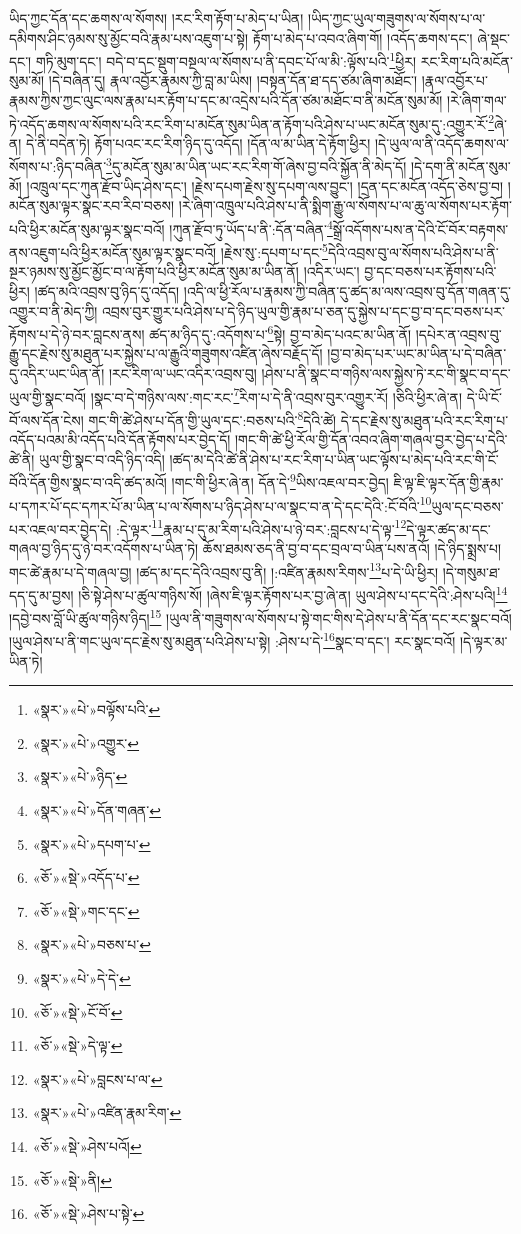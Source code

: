 ཡིད་ཀྱང་དོན་དང་ཆགས་ལ་སོགས། །རང་རིག་རྟོག་པ་མེད་པ་ཡིན། །ཡིད་ཀྱང་ཡུལ་གཟུགས་ལ་སོགས་པ་ལ་དམིགས་ཤིང་ཉམས་སུ་མྱོང་བའི་རྣམ་པས་འཇུག་པ་སྟེ། རྟོག་པ་མེད་པ་འབའ་ཞིག་གོ། །འདོད་ཆགས་དང་། ཞེ་སྡང་དང་། གཏི་མུག་དང་། བདེ་བ་དང་སྡུག་བསྔལ་ལ་སོགས་པ་ནི་དབང་པོ་ལ་མི་:ལྟོས་པའི་\footnote{«སྣར་»«པེ་»བལྟོས་པའི་}ཕྱིར། རང་རིག་པའི་མངོན་སུམ་མོ། །དེ་བཞིན་དུ། རྣལ་འབྱོར་རྣམས་ཀྱི་བླ་མ་ཡིས། །བསྟན་དོན་ཐ་དད་ཙམ་ཞིག་མཐོང་། །རྣལ་འབྱོར་པ་རྣམས་ཀྱིས་ཀྱང་ལུང་ལས་རྣམ་པར་རྟོག་པ་དང་མ་འདྲེས་པའི་དོན་ཙམ་མཐོང་བ་ནི་མངོན་སུམ་མོ། །རེ་ཞིག་གལ་ཏེ་འདོད་ཆགས་ལ་སོགས་པའི་རང་རིག་པ་མངོན་སུམ་ཡིན་ན་རྟོག་པའི་ཤེས་པ་ཡང་མངོན་སུམ་དུ་:འགྱུར་རོ་\footnote{«སྣར་»«པེ་»འགྱུར་}ཞེ་ན། དེ་ནི་བདེན་ཏེ། རྟོག་པའང་རང་རིག་ཉིད་དུ་འདོད། །དོན་ལ་མ་ཡིན་དེ་རྟོག་ཕྱིར། །དེ་ཡུལ་ལ་ནི་འདོད་ཆགས་ལ་སོགས་པ་:ཉིད་བཞིན་\footnote{«སྣར་»«པེ་»ཉིད་}དུ་མངོན་སུམ་མ་ཡིན་ཡང་རང་རིག་གོ་ཞེས་བྱ་བའི་སྐྱོན་ནི་མེད་དོ། །དེ་དག་ནི་མངོན་སུམ་མོ། །འཁྲུལ་དང་ཀུན་རྫོབ་ཡིད་ཤེས་དང་། །རྗེས་དཔག་རྗེས་སུ་དཔག་ལས་བྱུང་། །དྲན་དང་མངོན་འདོད་ཅེས་བྱ་བ། །མངོན་སུམ་ལྟར་སྣང་རབ་རིབ་བཅས། །རེ་ཞིག་འཁྲུལ་པའི་ཤེས་པ་ནི་སྨིག་རྒྱུ་ལ་སོགས་པ་ལ་ཆུ་ལ་སོགས་པར་རྟོག་པའི་ཕྱིར་མངོན་སུམ་ལྟར་སྣང་བའོ། །ཀུན་རྫོབ་ཏུ་ཡོད་པ་ནི་:དོན་བཞིན་\footnote{«སྣར་»«པེ་»དོན་གཞན་}སྒྲོ་འདོགས་པས་ན་དེའི་ངོ་བོར་བརྟགས་ནས་འཇུག་པའི་ཕྱིར་མངོན་སུམ་ལྟར་སྣང་བའོ། །རྗེས་སུ་:དཔག་པ་དང་\footnote{«སྣར་»«པེ་»དཔག་པ་}དེའི་འབྲས་བུ་ལ་སོགས་པའི་ཤེས་པ་ནི་སྔར་ཉམས་སུ་མྱོང་མྱོང་བ་ལ་རྟོག་པའི་ཕྱིར་མངོན་སུམ་མ་ཡིན་ནོ། །འདིར་ཡང་། བྱ་དང་བཅས་པར་རྟོགས་པའི་ཕྱིར། །ཚད་མའི་འབྲས་བུ་ཉིད་དུ་འདོད། །འདི་ལ་ཕྱི་རོལ་པ་རྣམས་ཀྱི་བཞིན་དུ་ཚད་མ་ལས་འབྲས་བུ་དོན་གཞན་དུ་འགྱུར་བ་ནི་མེད་ཀྱི། འབྲས་བུར་གྱུར་པའི་ཤེས་པ་དེ་ཉིད་ཡུལ་གྱི་རྣམ་པ་ཅན་དུ་སྐྱེས་པ་དང་བྱ་བ་དང་བཅས་པར་རྟོགས་པ་དེ་ཉེ་བར་བླངས་ནས། ཚད་མ་ཉིད་དུ་:འདོགས་པ་\footnote{«ཅོ་»«སྡེ་»འདོད་པ་}སྟེ། བྱ་བ་མེད་པའང་མ་ཡིན་ནོ། །དཔེར་ན་འབྲས་བུ་རྒྱུ་དང་རྗེས་སུ་མཐུན་པར་སྐྱེས་པ་ལ་རྒྱུའི་གཟུགས་འཛིན་ཞེས་བརྗོད་དོ། །བྱ་བ་མེད་པར་ཡང་མ་ཡིན་པ་དེ་བཞིན་དུ་འདིར་ཡང་ཡིན་ནོ། །རང་རིག་ལ་ཡང་འདིར་འབྲས་བུ། །ཤེས་པ་ནི་སྣང་བ་གཉིས་ལས་སྐྱེས་ཏེ་རང་གི་སྣང་བ་དང་ཡུལ་གྱི་སྣང་བའོ། །སྣང་བ་དེ་གཉིས་ལས་:གང་རང་\footnote{«ཅོ་»«སྡེ་»གང་དང་}རིག་པ་དེ་ནི་འབྲས་བུར་འགྱུར་རོ། །ཅིའི་ཕྱིར་ཞེ་ན། དེ་ཡི་ངོ་བོ་ལས་དོན་ངེས། གང་གི་ཚེ་ཤེས་པ་དོན་གྱི་ཡུལ་དང་:བཅས་པའི་\footnote{«སྣར་»«པེ་»བཅས་པ་}དེའི་ཚེ། དེ་དང་རྗེས་སུ་མཐུན་པའི་རང་རིག་པ་འདོད་པའམ་མི་འདོད་པའི་དོན་རྟོགས་པར་བྱེད་དོ། །གང་གི་ཚེ་ཕྱི་རོལ་གྱི་དོན་འབའ་ཞིག་གཞལ་བྱར་བྱེད་པ་དེའི་ཚེ་ནི། ཡུལ་གྱི་སྣང་བ་འདི་ཉིད་འདི། །ཚད་མ་དེའི་ཚེ་ནི་ཤེས་པ་རང་རིག་པ་ཡིན་ཡང་ལྟོས་པ་མེད་པའི་རང་གི་ངོ་བོའི་དོན་གྱིས་སྣང་བ་འདི་ཚད་མའོ། །གང་གི་ཕྱིར་ཞེ་ན། དོན་དེ་\footnote{«སྣར་»«པེ་»དེ་དེ་}ཡིས་འཇལ་བར་བྱེད། ཇི་ལྟ་ཇི་ལྟར་དོན་གྱི་རྣམ་པ་དཀར་པོ་དང་དཀར་པོ་མ་ཡིན་པ་ལ་སོགས་པ་ཉིད་ཤེས་པ་ལ་སྣང་བ་ན་དེ་དང་དེའི་:ངོ་བོའི་\footnote{«ཅོ་»«སྡེ་»ངོ་བོ་}ཡུལ་དང་བཅས་པར་འཇལ་བར་བྱེད་དེ། :དེ་ལྟར་\footnote{«ཅོ་»«སྡེ་»དེ་ལྟ་}རྣམ་པ་དུ་མ་རིག་པའི་ཤེས་པ་ཉེ་བར་:བླངས་པ་དེ་ལྟ་\footnote{«སྣར་»«པེ་»བླངས་པ་ལ་}དེ་ལྟར་ཚད་མ་དང་གཞལ་བྱ་ཉིད་དུ་ཉེ་བར་འདོགས་པ་ཡིན་ཏེ། ཆོས་ཐམས་ཅད་ནི་བྱ་བ་དང་བྲལ་བ་ཡིན་པས་ནའོ། །དེ་ཉིད་སྨྲས་པ། གང་ཚེ་རྣམ་པ་དེ་གཞལ་བྱ། །ཚད་མ་དང་དེའི་འབྲས་བུ་ནི། །:འཛིན་རྣམས་རིགས་\footnote{«སྣར་»«པེ་»འཛིན་རྣམ་རིག་}པ་དེ་ཡི་ཕྱིར། །དེ་གསུམ་ཐ་དད་དུ་མ་བྱས། །ཅི་སྟེ་ཤེས་པ་ཚུལ་གཉིས་སོ། །ཞེས་ཇི་ལྟར་རྟོགས་པར་བྱ་ཞེ་ན། ཡུལ་ཤེས་པ་དང་དེའི་:ཤེས་པའི།\footnote{«ཅོ་»«སྡེ་»ཤེས་པའོ།} །དབྱེ་བས་བློ་ཡི་ཚུལ་གཉིས་ཉིད།\footnote{«ཅོ་»«སྡེ་»ནི།} །ཡུལ་ནི་གཟུགས་ལ་སོགས་པ་སྟེ་གང་གིས་དེ་ཤེས་པ་ནི་དོན་དང་རང་སྣང་བའོ། །ཡུལ་ཤེས་པ་ནི་གང་ཡུལ་དང་རྗེས་སུ་མཐུན་པའི་ཤེས་པ་སྟེ། :ཤེས་པ་དེ་\footnote{«ཅོ་»«སྡེ་»ཤེས་པ་སྟེ་}སྣང་བ་དང་། རང་སྣང་བའོ། །དེ་ལྟར་མ་ཡིན་ཏེ། 